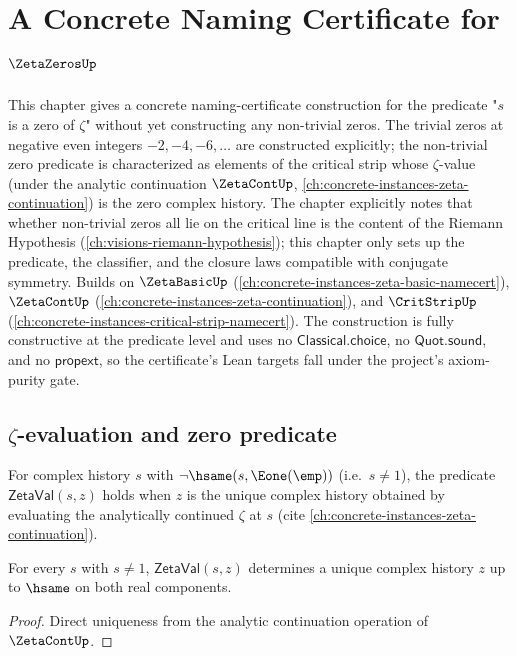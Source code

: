 \chapter{A Concrete Naming Certificate for \(\ZetaZerosUp\)}
\label{ch:concrete-instances-zeta-zeros-namecert}

This chapter gives a concrete naming-certificate construction for the predicate "\(s\) is a zero of \(\zeta\)" without yet constructing any non-trivial zeros. The trivial zeros at negative even integers \(-2, -4, -6, \ldots\) are constructed explicitly; the non-trivial zero predicate is characterized as elements of the critical strip whose \(\zeta\)-value (under the analytic continuation \(\ZetaContUp\), \autoref{ch:concrete-instances-zeta-continuation}) is the zero complex history. The chapter explicitly notes that whether non-trivial zeros all lie on the critical line is the content of the Riemann Hypothesis (\autoref{ch:visions-riemann-hypothesis}); this chapter only sets up the predicate, the classifier, and the closure laws compatible with conjugate symmetry. Builds on \(\ZetaBasicUp\) (\autoref{ch:concrete-instances-zeta-basic-namecert}), \(\ZetaContUp\) (\autoref{ch:concrete-instances-zeta-continuation}), and \(\CritStripUp\) (\autoref{ch:concrete-instances-critical-strip-namecert}). The construction is fully constructive at the predicate level and uses no \(\mathsf{Classical.choice}\), no \(\mathsf{Quot.sound}\), and no \(\mathsf{propext}\), so the certificate's Lean targets fall under the project's axiom-purity gate.

\section{\(\zeta\)-evaluation and zero predicate}

\begin{definition}
\label{def:zeta-val}
For complex history \(s\) with \(\neg \hsame(s, \Eone(\emp))\) (i.e.\ \(s \neq 1\)), the predicate \(\mathsf{ZetaVal}(s, z)\) holds when \(z\) is the unique complex history obtained by evaluating the analytically continued \(\zeta\) at \(s\) (cite \autoref{ch:concrete-instances-zeta-continuation}).
\end{definition}

\begin{lemma}
\label{lem:zeta-val-well-defined}
For every \(s\) with \(s \neq 1\), \(\mathsf{ZetaVal}(s, z)\) determines a unique complex history \(z\) up to \(\hsame\) on both real components.
\end{lemma}
\begin{proof}
Direct uniqueness from the analytic continuation operation of \(\ZetaContUp\).
\end{proof}

